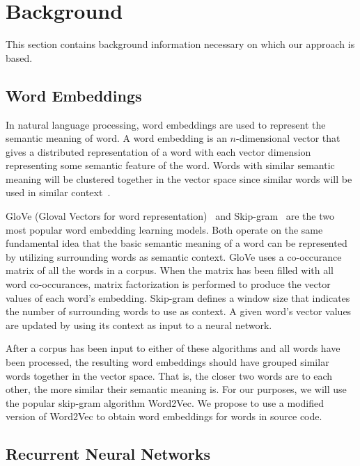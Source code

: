 \section{Background}

This section contains background information necessary on which our approach is based.

\subsection{Word Embeddings}

In natural language processing, word embeddings are used to represent the semantic meaning of word. A word embedding is an $n$-dimensional vector that gives a distributed representation of a word with each vector dimension representing some semantic feature of the word. Words with similar semantic meaning will be clustered together in the vector space since similar words will be used in similar context~\cite{mikolov2013distributed}.

GloVe (Gloval Vectors for word representation)~\cite{pennington2014glove} and Skip-gram~\cite{mikolov2013efficient} are the two most popular word embedding learning models. Both operate on the same fundamental idea that the basic semantic meaning of a word can be represented by utilizing surrounding words as semantic context. GloVe uses a co-occurance matrix of all the words in a corpus. When the matrix has been filled with all word co-occurances, matrix factorization is performed to produce the vector values of each word's embedding. Skip-gram defines a window size that indicates the number of surrounding words to use as context. A given word's vector values are updated by using its context as input to a neural network.

After a corpus has been input to either of these algorithms and all words have been processed, the resulting word embeddings should have grouped similar words together in the vector space. That is, the closer two words are to each other, the more similar their semantic meaning is. For our purposes, we will use the popular skip-gram algorithm Word2Vec. We propose to use a modified version of Word2Vec to obtain word embeddings for words in source code. 
 
\subsection{Recurrent Neural Networks}

